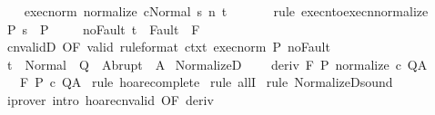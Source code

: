\begin{isabellebody}
\ \ \isamarkupfalse%
\ exec{\isacharunderscore}norm{\isacharcolon}\ {\isachardoublequoteopen}{\isasymGamma}{\isasymturnstile}{\isasymlangle}normalize\ c{\isacharcomma}Normal\ s{\isasymrangle}\ {\isacharequal}n{\isasymRightarrow}\ t{\isachardoublequoteclose}\ \isanewline
\ \ \ \ \isamarkupfalse%
\ {\isacharparenleft}rule\ execn{\isacharunderscore}to{\isacharunderscore}execn{\isacharunderscore}normalize{\isacharparenright}\isanewline
\ \ \isamarkupfalse%
\ P{\isacharcolon}\ {\isachardoublequoteopen}s\ {\isasymin}\ P{\isachardoublequoteclose}\ \isanewline
\ \ \isamarkupfalse%
\ noFault{\isacharcolon}\ {\isachardoublequoteopen}t\ {\isasymnotin}\ Fault\ {\isacharbackquote}\ F{\isachardoublequoteclose}\isanewline
\ \ \isamarkupfalse%
\ cnvalidD\ {\isacharbrackleft}OF\ valid\ {\isacharbrackleft}rule{\isacharunderscore}format{\isacharbrackright}\ ctxt\ exec{\isacharunderscore}norm\ P\ noFault{\isacharbrackright}\isanewline
\ \ \isamarkupfalse%
\ {\isachardoublequoteopen}t\ {\isasymin}\ Normal\ {\isacharbackquote}\ Q\ {\isasymunion}\ Abrupt\ {\isacharbackquote}\ A{\isachardoublequoteclose}\isacommand{{\isachardot}}\isamarkupfalse%
\isanewline
{}\isamarkupfalse%
%
\endisatagproof
{\isafoldproof}%
%
\isadelimproof
\isanewline
%
\endisadelimproof
\isanewline
{}\isamarkupfalse%
\ NormalizeD{\isacharcolon}\ \isanewline
\ \ \ deriv{\isacharcolon}\ {\isachardoublequoteopen}{\isasymGamma}{\isacharcomma}{\isasymTheta}{\isasymturnstile}\isactrlbsub {\isacharslash}F\isactrlesub \ P\ {\isacharparenleft}normalize\ c{\isacharparenright}\ Q{\isacharcomma}A{\isachardoublequoteclose}\isanewline
\ \ \ {\isachardoublequoteopen}{\isasymGamma}{\isacharcomma}{\isasymTheta}{\isasymturnstile}\isactrlbsub {\isacharslash}F\isactrlesub \ P\ c\ Q{\isacharcomma}A{\isachardoublequoteclose}\isanewline
%
\isadelimproof
%
\endisadelimproof
%
\isatagproof
{}\isamarkupfalse%
\ {\isacharparenleft}rule\ hoare{\isacharunderscore}complete{\isacharprime}{\isacharparenright}\isanewline
{}\isamarkupfalse%
\ {\isacharparenleft}rule\ allI{\isacharparenright}\isanewline
{}\isamarkupfalse%
\ {\isacharparenleft}rule\ NormalizeD{\isacharunderscore}sound{\isacharparenright}\isanewline
{}\isamarkupfalse%
\ {\isacharparenleft}iprover\ intro{\isacharcolon}\ hoare{\isacharunderscore}cnvalid\ {\isacharbrackleft}OF\ deriv{\isacharbrackright}{\isacharparenright}\isanewline
{}\isamarkupfalse%

\end{isabellebody}

